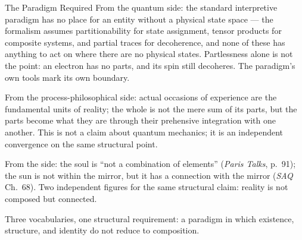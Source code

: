 \begin{convergencemoment}{The Paradigm Required}
From the quantum side: the standard interpretive paradigm has no place for an
entity without a physical state space --- the formalism assumes partitionability
for state assignment, tensor products for composite systems, and partial traces
for decoherence, and none of these has anything to act on where there are no
physical states. Partlessness alone is not the point: an electron has no parts,
and its spin still decoheres. The paradigm's own tools mark its own boundary.

From the process-philosophical side: actual occasions of experience are
the fundamental units of reality; the whole is not the mere sum of its parts,
but the parts become what they are through their prehensive integration with
one another. This is not a claim about quantum mechanics; it is an independent
convergence on the same structural point.

From the \bahai side: the soul is ``not a combination of elements''
(\textit{Paris Talks}, p.~91); the sun is not within the mirror, but it
has a connection with the mirror (\textit{SAQ} Ch.~68). Two independent
figures for the same structural claim: reality is not composed but connected.

Three vocabularies, one structural requirement: a paradigm in which
existence, structure, and identity do not reduce to composition.
\end{convergencemoment}
